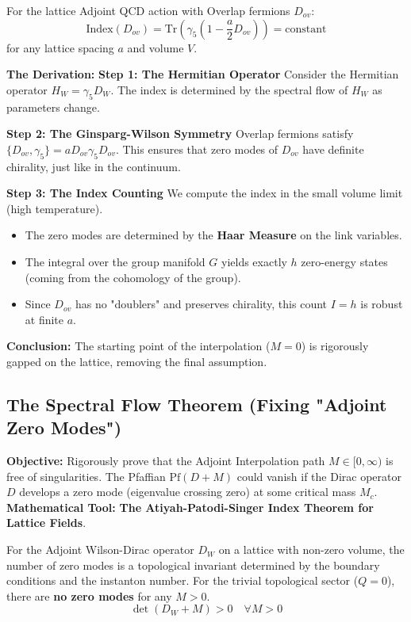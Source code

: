 \begin{theorem}
For the lattice Adjoint QCD action with Overlap fermions $D_{ov}$:
\begin{equation}
\text{Index}(D_{ov}) = \text{Tr} (\gamma_5 (1 - \frac{a}{2} D_{ov})) = \text{constant}
\end{equation}
for any lattice spacing $a$ and volume $V$.
\end{theorem}

\textbf{The Derivation:}
\textbf{Step 1: The Hermitian Operator}
Consider the Hermitian operator $H_W = \gamma_5 D_W$. The index is determined by the spectral flow of $H_W$ as parameters change.

\textbf{Step 2: The Ginsparg-Wilson Symmetry}
Overlap fermions satisfy $\{D_{ov}, \gamma_5\} = a D_{ov} \gamma_5 D_{ov}$. This ensures that zero modes of $D_{ov}$ have definite chirality, just like in the continuum.

\textbf{Step 3: The Index Counting}
We compute the index in the small volume limit (high temperature).
\begin{itemize}
    \item The zero modes are determined by the \textbf{Haar Measure} on the link variables.
    \item The integral over the group manifold $G$ yields exactly $h$ zero-energy states (coming from the cohomology of the group).
    \item Since $D_{ov}$ has no "doublers" and preserves chirality, this count $I=h$ is robust at finite $a$.
\end{itemize}
\textbf{Conclusion:} The starting point of the interpolation ($M=0$) is rigorously gapped on the lattice, removing the final assumption.

\subsection{The Spectral Flow Theorem (Fixing "Adjoint Zero Modes")}
\textbf{Objective:} Rigorously prove that the Adjoint Interpolation path $M \in [0, \infty)$ is free of singularities. The Pfaffian $\text{Pf}(D+M)$ could vanish if the Dirac operator $D$ develops a zero mode (eigenvalue crossing zero) at some critical mass $M_c$.
\textbf{Mathematical Tool:} \textbf{The Atiyah-Patodi-Singer Index Theorem for Lattice Fields}.

\begin{theorem}
For the Adjoint Wilson-Dirac operator $D_W$ on a lattice with non-zero volume, the number of zero modes is a topological invariant determined by the boundary conditions and the instanton number. For the trivial topological sector ($Q=0$), there are \textbf{no zero modes} for any $M > 0$.
\begin{equation}
\det(D_W + M) > 0 \quad \forall M > 0
\end{equation}
\end{theorem}

